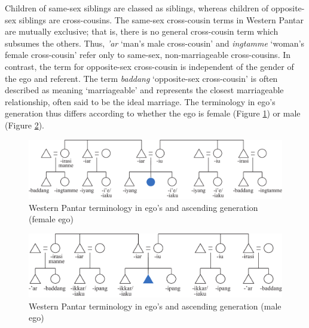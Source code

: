Children of same-sex siblings are classed as siblings, whereas children of opposite-sex siblings are cross-cousins. The same-sex cross-cousin terms in Western Pantar are mutually exclusive; that is, there is no general cross-cousin term which subsumes the others. Thus, \textit{'ar} `man's male cross-cousin' and \textit{ingtamme} `woman's female cross-cousin' refer only to same-sex, non-marriageable cross-cousins. In contrast, the term for opposite-sex cross-cousin is independent of the gender of the ego and referent. The term \textit{baddang} `opposite-sex cross-cousin' is often described as meaning `marriageable' and represents the closest marriageable relationship, often said to be the ideal marriage. The terminology in ego's generation thus differs according to whether the ego is female (Figure \ref{fig:5:1}) or male (Figure \ref{fig:5:2}).

\begin{figure}
\includegraphics[width=\textwidth]{figures/Holton_ch5_fig1.pdf}
\caption{Western Pantar terminology in ego's and ascending generation (female ego)}
\label{fig:5:1}
\end{figure}  
 
\begin{figure}
\includegraphics[width=\textwidth]{figures/Holton_ch5_fig2.pdf}
\caption{Western Pantar terminology in ego's and ascending generation (male ego)}
\label{fig:5:2}
\end{figure} 
 

